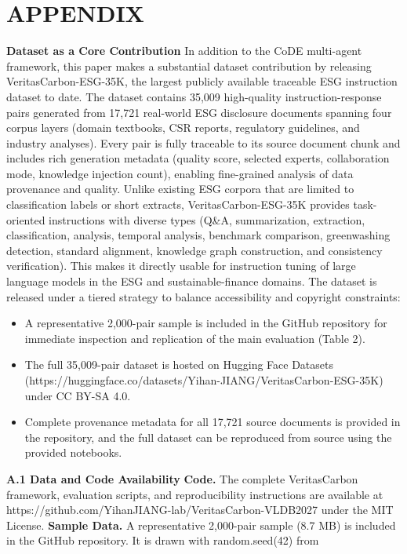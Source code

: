 \documentclass[9pt,twocolumn]{extarticle}
\begin{document}
\section{APPENDIX}
\textbf{Dataset as a Core Contribution}
In addition to the CoDE multi-agent framework, this paper makes a
substantial dataset contribution by releasing VeritasCarbon-ESG-35K, the
largest publicly available traceable ESG instruction dataset to date.
The dataset contains 35,009 high-quality instruction-response pairs
generated from 17,721 real-world ESG disclosure documents spanning four
corpus layers (domain textbooks, CSR reports, regulatory guidelines, and
industry analyses). Every pair is fully traceable to its source document
chunk and includes rich generation metadata (quality score, selected
experts, collaboration mode, knowledge injection count), enabling
fine-grained analysis of data provenance and quality.
Unlike existing ESG corpora that are limited to classification labels or
short extracts, VeritasCarbon-ESG-35K provides task-oriented
instructions with diverse types (Q\&A, summarization, extraction,
classification, analysis, temporal analysis, benchmark comparison,
greenwashing detection, standard alignment, knowledge graph
construction, and consistency verification). This makes it directly
usable for instruction tuning of large language models in the ESG and
sustainable-finance domains.
The dataset is released under a tiered strategy to balance accessibility
and copyright constraints:
\begin{itemize}
\item
  A representative 2,000-pair sample is included in the GitHub
  repository for immediate inspection and replication of the main
  evaluation (Table 2).
\item
  The full 35,009-pair dataset is hosted on Hugging Face Datasets
  (https://huggingface.co/datasets/Yihan-JIANG/VeritasCarbon-ESG-35K)
  under CC BY-SA 4.0.
\item
  Complete provenance metadata for all 17,721 source documents is
  provided in the repository, and the full dataset can be reproduced
  from source using the provided notebooks.
\end{itemize}
\textbf{A.1 Data and Code Availability}
\textbf{Code.} The complete VeritasCarbon framework, evaluation scripts,
and reproducibility instructions are available at
https://github.com/YihanJIANG-lab/VeritasCarbon-VLDB2027 under the MIT
License.
\textbf{Sample Data.} A representative 2,000-pair sample (8.7 MB) is
included in the GitHub repository. It is drawn with random.seed(42) from
\end{document}
